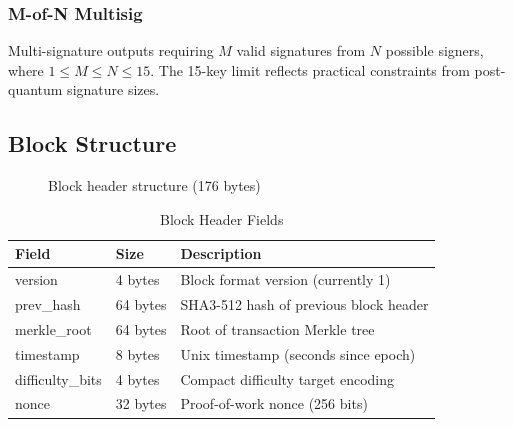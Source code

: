 \documentclass[11pt,a4paper]{article}
\begin{document}
\subsubsection{M-of-N Multisig}

Multi-signature outputs requiring $M$ valid signatures from $N$ possible signers, where $1 \leq M \leq N \leq 15$. The 15-key limit reflects practical constraints from post-quantum signature sizes.

\subsection{Block Structure}

\begin{figure}[h]
\centering
{}
\caption{Block header structure (176 bytes)}
\label{fig:header}
\end{figure}

\begin{table}[h]
\centering
\caption{Block Header Fields}
\label{tab:header}
\begin{tabular}{@{}llp{7cm}@{}}
\toprule
Field & Size & Description \\
\midrule
version & 4 bytes & Block format version (currently 1) \\
prev\_hash & 64 bytes & SHA3-512 hash of previous block header \\
merkle\_root & 64 bytes & Root of transaction Merkle tree \\
timestamp & 8 bytes & Unix timestamp (seconds since epoch) \\
difficulty\_bits & 4 bytes & Compact difficulty target encoding \\
nonce & 32 bytes & Proof-of-work nonce (256 bits) \\
\bottomrule
\end{tabular}
\end{table}
\end{document}
